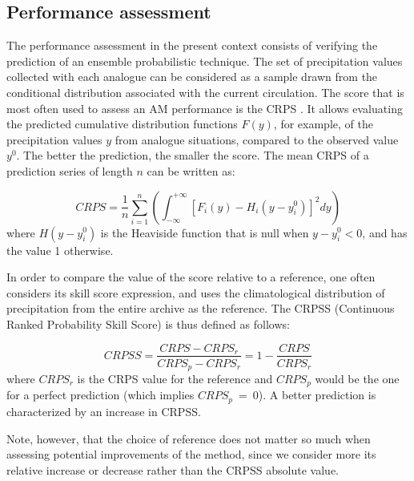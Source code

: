 \documentclass{ametsoc}
\begin{document}
 




\subsection{Performance assessment}



The performance assessment in the present context consists of verifying the prediction of an ensemble probabilistic technique. The set of precipitation values collected with each analogue can be considered as a sample drawn from the conditional distribution associated with the current circulation. The score that is most often used to assess an AM performance is the CRPS \citep[Continuous Ranked Probability Score,][]{Brown1974, Matheson1976, Hersbach2000}. It allows evaluating the predicted cumulative distribution functions $F(y)$, for example, of the precipitation values $y$ from analogue situations, compared to the observed value $y^{0}$. The better the prediction, the smaller the score. The mean CRPS of a prediction series of length $n$ can be written as:

\begin{equation}
\label{eq:CRPS}
CRPS = \frac{1}{n} \sum_{i=1}^{n} \left(  \int_{-\infty}^{+\infty} \left[ F_{i}(y)-H_{i}(y-y_{i}^{0})\right]^{2} dy \right) 
\end{equation}
where $H(y-y_{i}^{0})$ is the Heaviside function that is null when $y-y_{i}^{0}<0$, and has the value 1 otherwise.

In order to compare the value of the score relative to a reference, one often considers its skill score expression, and uses the climatological distribution of precipitation from the entire archive as the reference. The CRPSS (Continuous Ranked Probability Skill Score) is thus defined as follows:

\begin{equation}
\label{eq:CRPSS}
CRPSS = \frac{CRPS-CRPS_{r}}{CRPS_{p}-CRPS_{r}} = 1-\frac{CRPS}{CRPS_{r}}
\end{equation}
where $CRPS_{r}$ is the CRPS value for the reference and $CRPS_{p}$ would be the one for a perfect prediction (which implies $CRPS_{p}~=~0$). A better prediction is characterized by an increase in CRPSS.

Note, however, that the choice of reference does not matter so much when assessing potential improvements of the method, since we consider more its relative increase or decrease rather than the CRPSS absolute value.
\end{document}

